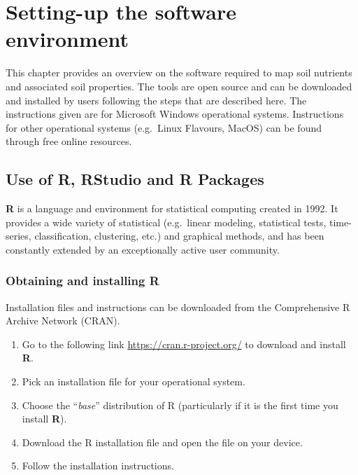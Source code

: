 \documentclass[
  10pt,
  b5paper,
  oneside]{book}
\providecommand{\tightlist}{%
  \setlength{\itemsep}{0pt}\setlength{\parskip}{0pt}}
\begin{document}
\hypertarget{setting-up-the-software-environment}{%
\chapter{Setting-up the software environment}\label{setting-up-the-software-environment}}

This chapter provides an overview on the software required to map soil nutrients and associated soil properties. The tools are open source and can be downloaded and installed by users following the steps that are described here. The instructions given are for Microsoft Windows operational systems. Instructions for other operational systems (e.g.~Linux Flavours, MacOS) can be found through free online resources.

\hypertarget{use-of-r-rstudio-and-r-packages}{%
\section{Use of R, RStudio and R Packages}\label{use-of-r-rstudio-and-r-packages}}

\textbf{R} is a language and environment for statistical computing created in 1992. It provides a wide variety of statistical (e.g.~linear modeling, statistical tests, time-series, classification, clustering, etc.) and graphical methods, and has been constantly extended by an exceptionally active user community.

\hypertarget{obtaining-and-installing-r}{%
\subsection{Obtaining and installing R}\label{obtaining-and-installing-r}}

Installation files and instructions can be downloaded from the Comprehensive R Archive Network (CRAN).

\begin{enumerate}
\def\labelenumi{\arabic{enumi}.}
\tightlist
\item
  Go to the following link \url{https://cran.r-project.org/} to download and install \textbf{R}.
\item
  Pick an installation file for your operational system.
\item
  Choose the ``\emph{base}'' distribution of R (particularly if it is the first time you install \textbf{R}).
\item
  Download the R installation file and open the file on your device.
\item
  Follow the installation instructions.
\end{enumerate}
\end{document}
